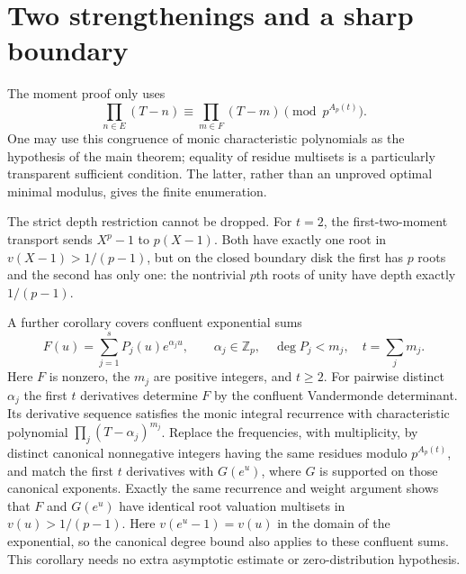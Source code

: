 \section{Two strengthenings and a sharp boundary}
The moment proof only uses
\[
 \prod_{n\in E}(T-n)\equiv\prod_{m\in F}(T-m)\pmod{p^{A_p(t)}}.
\]
One may use this congruence of monic characteristic polynomials as the
hypothesis of the main theorem; equality of residue multisets is a
particularly transparent sufficient condition. The latter, rather than
an unproved optimal minimal modulus, gives the finite enumeration.

The strict depth restriction cannot be dropped. For $t=2$, the
first-two-moment transport sends $X^p-1$ to $p(X-1)$.
Both have exactly one root in $v(X-1)>1/(p-1)$, but on the closed boundary
disk the first has $p$ roots and the second has only one: the nontrivial
$p$th roots of unity have depth exactly $1/(p-1)$.

A further corollary covers confluent exponential sums
\[
 F(u)=\sum_{j=1}^s P_j(u)e^{\alpha_j u},\qquad
 \alpha_j\in\mathbb Z_p,\quad \deg P_j<m_j,\quad t=\sum_jm_j.
\]
Here $F$ is nonzero, the $m_j$ are positive integers, and $t\ge2$.
For pairwise distinct $\alpha_j$ the first $t$ derivatives determine $F$ by the
confluent Vandermonde determinant. Its derivative sequence satisfies
the monic integral recurrence with characteristic polynomial
$\prod_j(T-\alpha_j)^{m_j}$. Replace the frequencies, with multiplicity,
by distinct canonical nonnegative integers having the same residues
modulo $p^{A_p(t)}$, and match the first $t$ derivatives with
$G(e^u)$, where $G$ is supported on those canonical exponents.
Exactly the same recurrence and weight argument shows that $F$ and
$G(e^u)$ have identical root valuation multisets in $v(u)>1/(p-1)$.
Here $v(e^u-1)=v(u)$ in the domain of the exponential, so the canonical
degree bound also applies to these confluent sums. This corollary needs
no extra asymptotic estimate or zero-distribution hypothesis.

